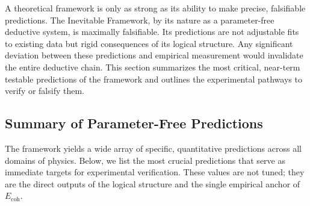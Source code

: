 \documentclass[11pt,a4paper]{article}
\begin{document}
A theoretical framework is only as strong as its ability to make precise, falsifiable predictions. The Inevitable Framework, by its nature as a parameter-free deductive system, is maximally falsifiable. Its predictions are not adjustable fits to existing data but rigid consequences of its logical structure. Any significant deviation between these predictions and empirical measurement would invalidate the entire deductive chain. This section summarizes the most critical, near-term testable predictions of the framework and outlines the experimental pathways to verify or falsify them.

\subsection{Summary of Parameter-Free Predictions}
The framework yields a wide array of specific, quantitative predictions across all domains of physics. Below, we list the most crucial predictions that serve as immediate targets for experimental verification. These values are not tuned; they are the direct outputs of the logical structure and the single empirical anchor of \(E_{\text{coh}}\).
\end{document}
